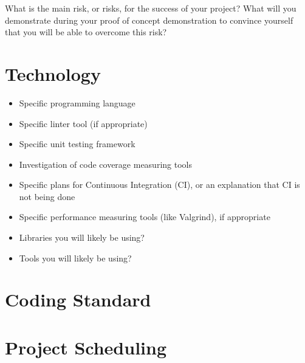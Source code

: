 \documentclass{article}
\begin{document}
What is the main risk, or risks, for the success of your project?  What will you
demonstrate during your proof of concept demonstration to convince yourself that
you will be able to overcome this risk?

\section{Technology}

\begin{itemize}
\item Specific programming language
\item Specific linter tool (if appropriate)
\item Specific unit testing framework
\item Investigation of code coverage measuring tools
\item Specific plans for Continuous Integration (CI), or an explanation that CI
  is not being done
\item Specific performance measuring tools (like Valgrind), if
  appropriate
\item Libraries you will likely be using?
\item Tools you will likely be using?
\end{itemize}

\section{Coding Standard}

\section{Project Scheduling}

\end{document}
